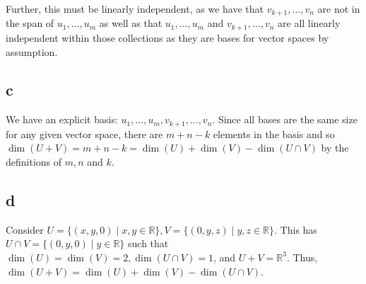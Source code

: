 \documentclass[12pt,letterpaper]{article}
\theoremstyle{definition}
\newcommand{\R}{\mathbb{R}}
\begin{document}
Further, this must be linearly independent, as we have that $v_{k+1}, ...,
v_{n}$ are not in the span of $u_1, ..., u_m$ as well as that $u_1, ..., u_m$
and $v_{k+1}, ..., v_n$ are all linearly independent within those collections as
they are bases for vector spaces by assumption.

\subsection*{c}

We have an explicit basis: $u_1, ..., u_m, v_{k+1}, ..., v_{n}$. Since all bases
are the same size for any given vector space, there are $m + n - k$ elements in
the basis and so $\dim(U + V) = m + n - k = \dim(U) + \dim(V) - \dim(U \cap V)$
by the definitions of $m, n$ and $k$.

\subsection*{d}

Consider $U = \{(x, y, 0) \mid x, y \in \R\}, V = \{(0,y,z) \mid y, z \in \R\}$.
This has $U \cap V = \{(0, y, 0) \mid y \in \R\}$ such that $\dim(U) = \dim(V) =
2, \dim(U \cap V) = 1$, and $U + V = \R^3$. Thus, $\dim(U + V) = \dim(U) +
\dim(V) - \dim(U \cap V)$. 
\end{document}
